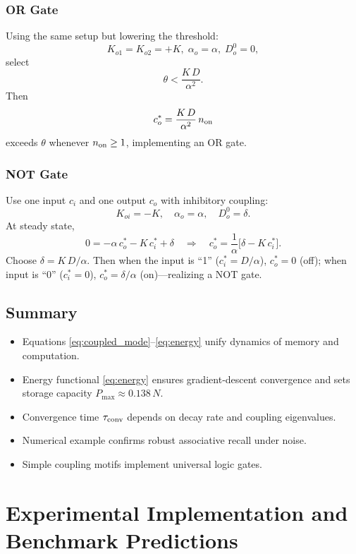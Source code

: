 \subsubsection{OR Gate}
Using the same setup but lowering the threshold:
\[
K_{o1} = K_{o2} = +K,\; \alpha_o = \alpha,\; D_o^0 = 0,
\]
select
\[
\theta < \frac{K\,D}{\alpha^2}.
\]
Then
\[
c_o^* = \frac{K\,D}{\alpha^2}\,n_{\rm on}
\]
exceeds $\theta$ whenever $n_{\rm on}\ge1$, implementing an OR gate.

\subsubsection{NOT Gate}
Use one input $c_i$ and one output $c_o$ with inhibitory coupling:
\[
K_{oi} = -K,\quad \alpha_o = \alpha,\quad D_o^0 = \delta.
\]
At steady state,
\[
0 = -\alpha\,c_o^* - K\,c_i^* + \delta
\quad\Longrightarrow\quad
c_o^* = \frac{1}{\alpha}\bigl[\delta - K\,c_i^*\bigr].
\]
Choose $\delta = K\,D/\alpha$.  Then when the input is “1” ($c_i^*=D/\alpha$), $c_o^*=0$ (off); when input is “0” ($c_i^*=0$), $c_o^*=\delta/\alpha$ (on)—realizing a NOT gate.

\subsection{Summary}
\begin{itemize}
  \item Equations \eqref{eq:coupled_mode}--\eqref{eq:energy} unify dynamics of memory and computation.
  \item Energy functional \eqref{eq:energy} ensures gradient‐descent convergence and sets storage capacity $P_{\max}\approx0.138\,N$.
  \item Convergence time $\tau_{\rm conv}$ depends on decay rate and coupling eigenvalues.
  \item Numerical example confirms robust associative recall under noise.
  \item Simple coupling motifs implement universal logic gates.
\end{itemize}

\section{Experimental Implementation and Benchmark Predictions}

